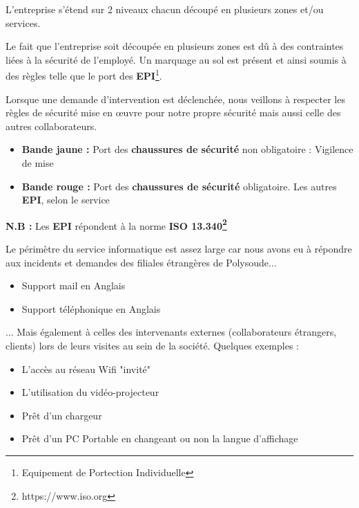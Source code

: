 \documentclass[11pt,a4paper,oneside]{article}
\begin{document}
L'entreprise s'étend sur 2 niveaux chacun découpé en plusieurs zones et/ou services.

Le fait que l'entreprise soit découpée en plusieurs zones est dû à des contraintes liées à la sécurité de l'employé. Un marquage au sol est présent et ainsi soumis à des règles telle que le port des \textbf{EPI}\footnote{Equipement de Portection Individuelle}.

Lorsque une demande d'intervention est déclenchée, nous veillons à respecter les règles de sécurité mise en \oe{}uvre pour notre propre sécurité mais aussi celle des autres collaborateurs.\\
\begin{itemize}
    \item \textbf{Bande jaune :} Port des \textbf{chaussures de sécurité} non obligatoire : Vigilence de mise
    \item \textbf{Bande rouge :} Port des \textbf{chaussures de sécurité} obligatoire. Les autres \textbf{EPI}, selon le service
\end{itemize}

\begin{center}
    \textbf{N.B :} Les \textbf{EPI} répondent à la norme \textbf{ISO 13.340\footnote{https://www.iso.org}}
\end{center}

Le périmètre du service informatique est assez large car nous avons eu à répondre aux incidents et demandes des filiales étrangères de Polysoude...

\begin{itemize}
    \item Support mail en Anglais
    \item Support téléphonique en Anglais \\
\end{itemize}

... Mais également à celles des intervenants externes (collaborateurs étrangers, clients) lors de leurs visites au sein de la société. Quelques exemples :

\begin{itemize}
    \item L'accès au réseau Wifi "invité"
    \item L'utilisation du vidéo-projecteur
    \item Prêt d'un chargeur 
    \item Prêt d'un PC Portable en changeant ou non la langue d'affichage
\end{itemize}
\end{document}
